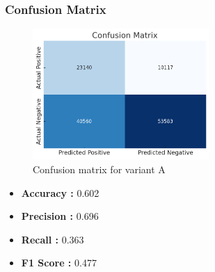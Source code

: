 \subsubsection{Confusion Matrix}
\begin{figure}[H]
    \centering
    \includegraphics[width=0.6\textwidth]{ressources/confusion_matrix_2.png}
    \caption{Confusion matrix for variant A}
    \label{fig:confusion_matrix_2}
\end{figure}
\begin{itemize}
    \item \textbf{Accuracy :} 0.602
    \item \textbf{Precision :} 0.696
    \item \textbf{Recall :} 0.363
    \item \textbf{F1 Score :} 0.477
\end{itemize}
